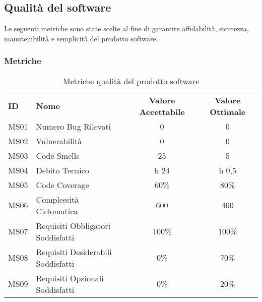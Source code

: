 \subsection{Qualità del software}
Le seguenti metriche sono state scelte al fine di garantire affidabilità, sicurezza, manutenibilità e semplicità del prodotto software.

    \subsubsection{Metriche}
    \begin{table} [h!]
        \begin{center}
            \begin{tabular} {m{2 cm} m{7 cm} c c }
                \rowcolor{lightgray}
                \textbf{ID} & \textbf{Nome}           & \textbf{Valore Accettabile} & \textbf{Valore Ottimale}\\
                MS01        & Numero Bug Rilevati     & 0                           & 0\\
                MS02        & Vulnerabilità           & 0                           & 0\\
                MS03        & Code Smells             & 25                          & 5\\
                MS04        & Debito Tecnico          & h 24                        & h 0,5\\
                MS05        & Code Coverage           & 60\%                        & 80\%\\
                MS06        & Complessità Ciclomatica & 600                         & 400\\
                MS07        & Requisiti Obbligatori Soddisfatti & 100\%             & 100\%\\
                MS08        & Requisiti Desiderabili Soddisfatti & 0\%              & 70\%\\
                MS09        & Requisiti Opzionali Soddisfatti & 0\%                 & 20\%\\
            \end{tabular}
            \caption{Metriche qualità del prodotto software}
        \end{center}
    \end{table}